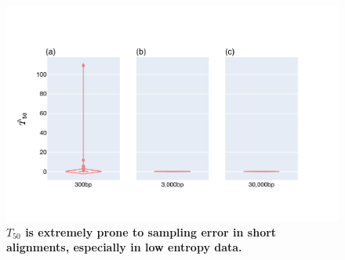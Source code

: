 \begin{figure}[htbp]
\centering
\includegraphics[width=\textwidth]{figures/plots/synthetic/T50/HighJSDLowEntropy-seq_len.pdf}\caption{\textbf{$T_{50}$ is extremely prone to sampling error in short alignments, especially in low entropy data.}}
\label{fig:T50-short_long}
\end{figure}